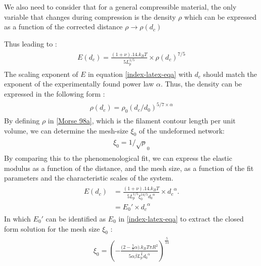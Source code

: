 \documentclass[A4paperpaper,11pt,english]{sphinxmanual}
\begin{document}
We also need to consider that for a general compressible material, the
only variable that changes during compression is the density \(\rho\)
which can be expressed as a function of the corrected distance \(\rho \to
\rho(d_c)\)

Thus leading to :
\label{index-latex:equation-eqa}\begin{gather}
\begin{split}E(d_c)=\frac{ (1+\nu).14.k_BT}{5L_p^{1/5}}\times \rho(d_c)^{7/5}\end{split}\label{index-latex-eqa}
\end{gather}
The scaling exponent of \(E\) in equation \eqref{index-latex-eqa} with \(d_c\) should match the exponent
of the experimentally found power law \(\alpha\). Thus, the density can be
expressed in the following form :
\label{index-latex:equation-eq-rho}\begin{gather}
\begin{split}\rho(d_c)=\rho_0(d_c/d_0)^{5/7\times\alpha}\end{split}\label{index-latex-eq-rho}
\end{gather}
By defining \(\rho\) in {\hyperref[index-latex:morse1998a]{{[}Morse 98a{]}}}, which is
the filament contour length per unit volume, we can determine the
mesh-size \(\xi_0\) of the undeformed network:
\label{index-latex:equation-eqa38}\begin{gather}
\begin{split}\xi_0 = 1/\sqrt\rho_0\end{split}\label{index-latex-eqa38}
\end{gather}
By comparing this to the phenomenological fit, we can express the elastic
modulus as a function of the distance, and the mesh size, as a function of the
fit parameters and the characteristic scales of the system.
\label{index-latex:equation-eqb}\begin{gather}
\begin{split}E(d_c)     &=  \frac{(1+\nu).14.k_BT}{5L_p^{1/5}\xi_0^{14/5} \left.d_0\right.^{\alpha}}\times \left.d_c\right.^{\alpha}.\\
                &=  E_0' \times \left.d_c\right.^{\alpha}\end{split}\label{index-latex-eqb}
\end{gather}
In which \(E_0'\) can be identified as \(E_0\) in \eqref{index-latex-eqa} to extract the
closed form solution for the mesh size \(\xi_0\) :
\label{index-latex:equation-eqa39}\begin{gather}
\begin{split}\xi_0=\left(-\frac{({2-\frac{5}{7}\alpha)}.k_BT\pi R^2}{5\alpha \beta L_p^{\frac{1}{5}}\left.d_0\right.^{\alpha}}\right)^{\frac{5}{14}}\end{split}\label{index-latex-eqa39}
\end{gather}
\end{document}

